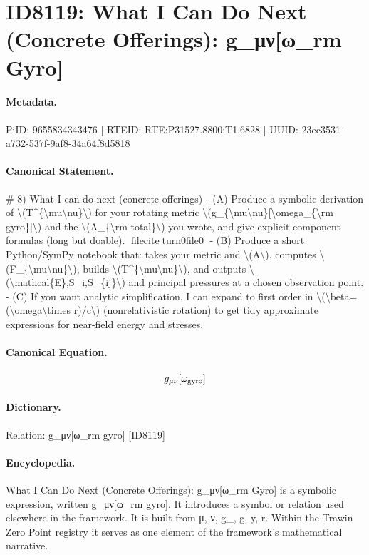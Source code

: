 \section*{ID8119: What I Can Do Next (Concrete Offerings): g\_μν[ω\_rm Gyro]}
\paragraph{Metadata.}
PiID: 9655834343476 | RTEID: RTE:P31527.8800:T1.6828 | UUID: 23ec3531-a732-537f-9af8-34a64f8d5818

\paragraph{Canonical Statement.}
\# 8) What I can do next (concrete offerings) - (A) Produce a symbolic derivation of \textbackslash{}(T\textasciicircum{}\{\textbackslash{}mu\textbackslash{}nu\}\textbackslash{}) for your rotating metric \textbackslash{}(g\_\{\textbackslash{}mu\textbackslash{}nu\}[\textbackslash{}omega\_\{\textbackslash{}rm gyro\}]\textbackslash{}) and the \textbackslash{}(A\_\{\textbackslash{}rm total\}\textbackslash{}) you wrote, and give explicit component formulas (long but doable). fileciteturn0file0 - (B) Produce a short Python/SymPy notebook that: takes your metric and \textbackslash{}(A\textbackslash{}), computes \textbackslash{}(F\_\{\textbackslash{}mu\textbackslash{}nu\}\textbackslash{}), builds \textbackslash{}(T\textasciicircum{}\{\textbackslash{}mu\textbackslash{}nu\}\textbackslash{}), and outputs \textbackslash{}(\textbackslash{}mathcal\{E\},S\_i,S\_\{ij\}\textbackslash{}) and principal pressures at a chosen observation point. - (C) If you want analytic simplification, I can expand to first order in \textbackslash{}(\textbackslash{}beta=(\textbackslash{}omega\textbackslash{}times r)/c\textbackslash{}) (nonrelativistic rotation) to get tidy approximate expressions for near-field energy and stresses.

\paragraph{Canonical Equation.}
\[
g_{\mu\nu}[\omega_{\rm gyro}]
\]

\paragraph{Dictionary.}
Relation: g\_μν[ω\_rm gyro] [ID8119]

\paragraph{Encyclopedia.}
What I Can Do Next (Concrete Offerings): g\_μν[ω\_rm Gyro] is a symbolic expression, written g\_μν[ω\_rm gyro]. It introduces a symbol or relation used elsewhere in the framework. It is built from μ, ν, g\_, g, y, r. Within the Trawin Zero Point registry it serves as one element of the framework's mathematical narrative.
